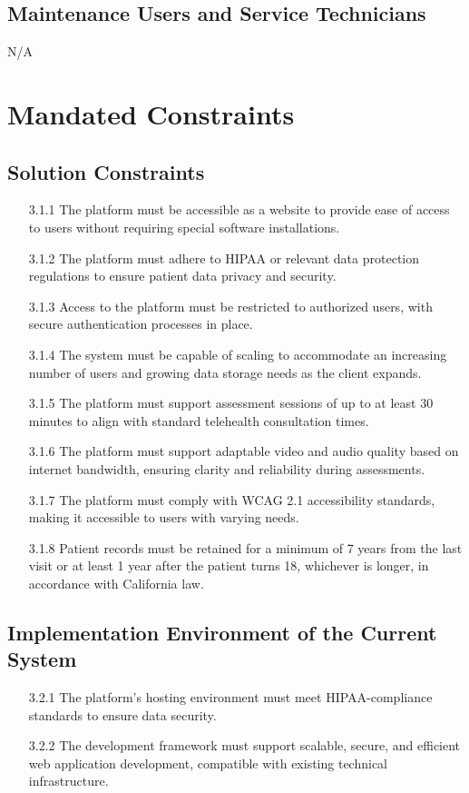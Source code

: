 \documentclass[12pt]{article}
\begin{document}
\subsection{Maintenance Users and Service Technicians}
N/A\\

\section{Mandated Constraints}
\subsection{Solution Constraints}
\begin{itemize}
  \item[3.1.1] The platform must be accessible as a website to provide ease of access to users without requiring special software installations.
  \item[3.1.2] The platform must adhere to HIPAA or relevant data protection regulations to ensure patient data privacy and security.
  \item[3.1.3] Access to the platform must be restricted to authorized users, with secure authentication processes in place.
  \item[3.1.4] The system must be capable of scaling to accommodate an increasing number of users and growing data storage needs as the client expands.
  \item[3.1.5] The platform must support assessment sessions of up to at least 30 minutes to align with standard telehealth consultation times.
  \item[3.1.6] The platform must support adaptable video and audio quality based on internet bandwidth, ensuring clarity and reliability during assessments.
  \item[3.1.7] The platform must comply with WCAG 2.1 accessibility standards, making it accessible to users with varying needs.
  \item[3.1.8] Patient records must be retained for a minimum of 7 years from the last visit or at least 1 year after the patient turns 18, whichever is 
  longer, in accordance with California law.
\end{itemize}
\subsection{Implementation Environment of the Current System}
\begin{itemize}
  \item[3.2.1] The platform’s hosting environment must meet HIPAA-compliance standards to ensure data security.
  \item[3.2.2] The development framework must support scalable, secure, and efficient web application development, compatible with existing technical 
  infrastructure.
\end{itemize}
\end{document}
